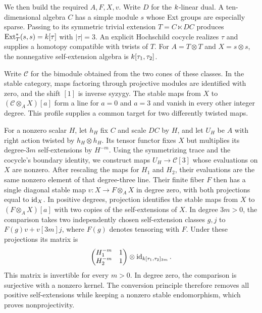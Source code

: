 We then build the required $A,F,X,v$. Write $D$ for the $k$-linear dual.
A ten-dimensional algebra $C$
has a simple module $s$ whose Ext groups are especially sparse. Passing
to its symmetric trivial extension $T=C\ltimes DC$ produces
$\operatorname{Ext}_T^*(s,s)=k[\tau]$ with $|\tau|=3$. An explicit Hochschild
cocycle realizes $\tau$ and supplies a homotopy compatible with twists
of $T$. For $A=T\otimes T$ and $X=s\otimes s$, the nonnegative
self-extension algebra is $k[\tau_1,\tau_2]$.

Write $\mathcal C$ for the bimodule obtained from the two cones of
these classes. In the stable category, maps factoring through projective
modules are identified with zero, and the shift $[1]$ is inverse syzygy.
The stable maps from $X$ to
$(\mathcal C\otimes_A X)[a]$ form a line for $a=0$ and $a=3$ and
vanish in every other integer degree. This profile supplies a common
target for two differently twisted maps.

For a nonzero scalar $H$, let $h_H$ fix $C$ and scale $DC$ by $H$,
and let $U_H$ be $A$ with right action twisted by $h_H\otimes h_H$.
Its tensor functor fixes $X$ but multiplies its degree-$3m$
self-extensions by $H^{-m}$. Using the symmetrizing trace and the
cocycle's boundary identity, we construct maps $U_H\to\mathcal C[3]$
whose evaluations on $X$ are nonzero. After rescaling the maps for
$H_1$ and $H_2$, their evaluations are the same nonzero element of
that degree-three line.
Their finite fiber $F$ then has a single diagonal stable map
$v:X\to F\otimes_A X$ in degree zero, with both projections equal to
$\operatorname{id}_X$. In positive degrees, projection identifies the stable maps
from $X$ to $(F\otimes_A X)[a]$ with two copies of the self-extensions
of $X$. In degree $3m>0$, the comparison takes two independently chosen
self-extension classes $g,j$ to $F(g)v+v[3m]j$, where $F(g)$ denotes
tensoring with $F$. Under these projections its matrix is
\[
 \begin{pmatrix}H_1^{-m}&1\\H_2^{-m}&1\end{pmatrix}
 \otimes\operatorname{id}_{k[\tau_1,\tau_2]_{3m}}.
\]
This matrix is invertible for every $m>0$. In degree zero, the
comparison is surjective with a nonzero kernel. The conversion
principle therefore removes all positive self-extensions while keeping
a nonzero stable endomorphism, which proves nonprojectivity.

